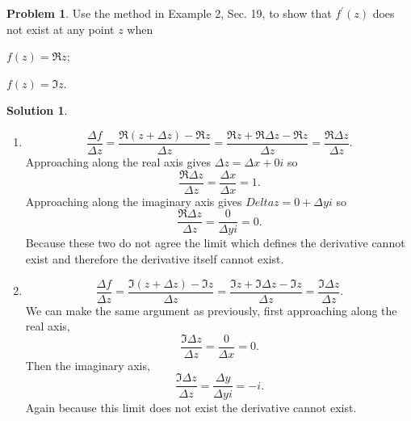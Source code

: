 \documentclass[10pt]{article}
\theoremstyle{definition}
\newtheorem{problem}{Problem}
\newtheorem{soln}{Solution}
\newcommand{\primed}[1]{#1^\prime}
\begin{document}
\begin{problem}
Use the method in Example 2, Sec. 19, to show that $\primed{f}(z)$ does not exist at any point
$z$ when
\begin{center}
  \begin{enumerate*}[label=(\alph*)]
    \item $f(z)=\Re z$;\qquad~
    \item $f(z)=\Im z$.
  \end{enumerate*}
\end{center}
\end{problem}
\begin{soln}
  \begin{enumerate}[label=(\alph*)]
    \item $$\frac{\Delta f}{\Delta z}
            =\frac{\Re (z+\Delta z)- \Re z}{\Delta z}
            =\frac{\Re z+\Re \Delta z - \Re z}{\Delta z}
            =\frac{\Re \Delta z}{\Delta z}.$$
          Approaching along the real axis gives $\Delta z=\Delta x+0i$ so
          $$\frac{\Re \Delta z}{\Delta z}=\frac{\Delta x}{\Delta x}=1.$$
          Approaching along the imaginary axis gives $Delta z = 0+\Delta yi$ so
          $$\frac{\Re \Delta z}{\Delta z}=\frac{0}{\Delta yi}=0.$$
          Because these two do not agree the limit which defines the derivative cannot exist
          and therefore the derivative itself cannot exist.
    \item $$\frac{\Delta f}{\Delta z}
            =\frac{\Im (z+\Delta z)- \Im z}{\Delta z}
            =\frac{\Im z+\Im \Delta z - \Im z}{\Delta z}
            =\frac{\Im \Delta z}{\Delta z}.$$
          We can make the same argument as previously, first approaching along the real axis,
          $$\frac{\Im \Delta z}{\Delta z}=\frac{0}{\Delta x}=0.$$
          Then the imaginary axis,
          $$\frac{\Im \Delta z}{\Delta z}=\frac{\Delta y}{\Delta yi}=-i.$$
          Again because this limit does not exist the derivative cannot exist.
  \end{enumerate}
\end{soln}
\end{document}
